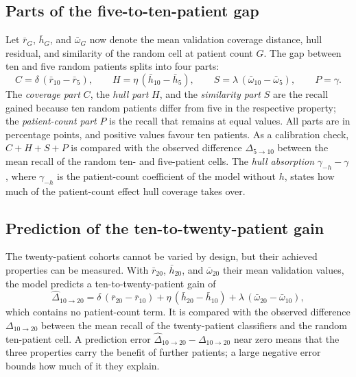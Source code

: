 \documentclass[11pt]{article}
\begin{document}
\subsection{Parts of the five-to-ten-patient gap}
\label{sec:decomposition}
Let $\bar r_{G}$, $\bar h_{G}$, and $\bar\omega_{G}$ now denote the mean validation coverage distance, hull residual, and similarity of the random cell at patient count $G$. The gap between ten and five random patients splits into four parts:
\begin{equation}
 C=\delta\,(\bar r_{10}-\bar r_{5}),\qquad
 H=\eta\,(\bar h_{10}-\bar h_{5}),\qquad
 S=\lambda\,(\bar\omega_{10}-\bar\omega_{5}),\qquad
 P=\gamma.
 \label{eq:parts}
\end{equation}
\noindent The \emph{coverage part} $C$, the \emph{hull part} $H$, and the \emph{similarity part} $S$ are the recall gained because ten random patients differ from five in the respective property; the \emph{patient-count part} $P$ is the recall that remains at equal values. All parts are in percentage points, and positive values favour ten patients. As a calibration check, $C+H+S+P$ is compared with the observed difference $\Delta_{5\to10}$ between the mean recall of the random ten- and five-patient cells. The \emph{hull absorption} $\gamma_{-h}-\gamma$, where $\gamma_{-h}$ is the patient-count coefficient of the model without $h$, states how much of the patient-count effect hull coverage takes over.

\subsection{Prediction of the ten-to-twenty-patient gain}
\label{sec:prediction}
The twenty-patient cohorts cannot be varied by design, but their achieved properties can be measured. With $\bar r_{20}$, $\bar h_{20}$, and $\bar\omega_{20}$ their mean validation values, the model predicts a ten-to-twenty-patient gain of
\begin{equation}
 \hat\Delta_{10\to20}=\delta\,(\bar r_{20}-\bar r_{10})+\eta\,(\bar h_{20}-\bar h_{10})+\lambda\,(\bar\omega_{20}-\bar\omega_{10}),
 \label{eq:prediction}
\end{equation}
\noindent which contains no patient-count term. It is compared with the observed difference $\Delta_{10\to20}$ between the mean recall of the twenty-patient classifiers and the random ten-patient cell. A prediction error $\hat\Delta_{10\to20}-\Delta_{10\to20}$ near zero means that the three properties carry the benefit of further patients; a large negative error bounds how much of it they explain.
\end{document}
